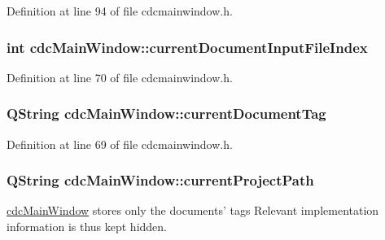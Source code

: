 Definition at line 94 of file cdcmainwindow.\+h.

\hypertarget{classcdc_main_window_aca3064de74e5cf938c009d5ab8f2e805}{
\subsubsection[{current\+Document\+Input\+File\+Index}]{\setlength{\rightskip}{0pt plus 5cm}int cdc\+Main\+Window\+::current\+Document\+Input\+File\+Index\hspace{0.3cm}{\ttfamily [private]}}}\label{classcdc_main_window_aca3064de74e5cf938c009d5ab8f2e805}


Definition at line 70 of file cdcmainwindow.\+h.

\hypertarget{classcdc_main_window_aa819ac3dd6acd06ae65d136a4f683e97}{
\subsubsection[{current\+Document\+Tag}]{\setlength{\rightskip}{0pt plus 5cm}Q\+String cdc\+Main\+Window\+::current\+Document\+Tag\hspace{0.3cm}{\ttfamily [private]}}}\label{classcdc_main_window_aa819ac3dd6acd06ae65d136a4f683e97}


Definition at line 69 of file cdcmainwindow.\+h.

\hypertarget{classcdc_main_window_a2a636f427e14608215f1115de3369ded}{
\subsubsection[{current\+Project\+Path}]{\setlength{\rightskip}{0pt plus 5cm}Q\+String cdc\+Main\+Window\+::current\+Project\+Path\hspace{0.3cm}{\ttfamily [private]}}}\label{classcdc_main_window_a2a636f427e14608215f1115de3369ded}
\hyperlink{classcdc_main_window}{cdc\+Main\+Window} stores only the documents' tags Relevant implementation information is thus kept hidden. 

